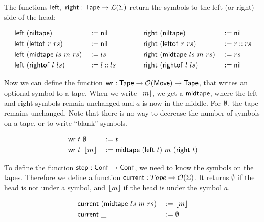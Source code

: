 The functions $\mathsf{left},~\mathsf{right} : \mathsf{Tape} \rightarrow \mathcal{L}(\Sigma)$ return the symbols to the left (or right) side of the head:
\begin{definition}
  \begin{alignat*}{4}
    \mathsf{left} &~(\mathsf{niltape})                 &&:= \mathsf{nil}
    \quad\quad\quad\quad
    & \mathsf{right}&~(\mathsf{niltape})               &&:= \mathsf{nil} \\
    \mathsf{left} &~(\mathsf{leftof}~{r}~{rs})         &&:= \mathsf{nil}
    & \mathsf{right}&~(\mathsf{leftof}~{r}~{rs})       &&:= r \mathbin{::} rs \\
    \mathsf{left} &~(\mathsf{midtape}~{ls}~{m}~{rs})   &&:= ls
    & \mathsf{right}&~(\mathsf{midtape}~{ls}~{m}~{rs}) &&:= rs \\
    \mathsf{left} &~(\mathsf{rightof}~{l}~{ls})        &&:= l \mathbin{::} ls
    & \mathsf{right}&~(\mathsf{rightof}~{l}~{ls})      &&:= \mathsf{nil}
  \end{alignat*}
\end{definition}


Now we can define the function $\mathsf{wr} : \mathsf{Tape} \rightarrow \mathcal{O}(\mathsf{Move}) \rightarrow \mathsf{Tape}$, that writes an optional symbol to a tape.  When we write $\left\lfloor {m} \right\rfloor$,
we get a $\mathsf{midtape}$, where the left and right symbols remain unchanged and $a$ is now in the middle.  For $\emptyset$, the tape remains unchanged.
Note that there is no way to decrease the number of symbols on a tape, or to write ``blank'' symbols.

\begin{definition}
  \begin{alignat*}{3}
    \mathsf{wr}~t &~ \emptyset   &&:= t \\
    \mathsf{wr}~t &~ \left\lfloor {m} \right\rfloor &&:= \mathsf{midtape}~(\mathsf{left}~t)~{m}~(\mathsf{right}~t)
  \end{alignat*}
\end{definition}

To define the function $\mathsf{step} : \mathsf{Conf} \rightarrow \mathsf{Conf}$, we need to know the symbols on the tapes.  Therefore we define a function
$\mathsf{current} : Tape \rightarrow \mathcal{O}(\Sigma)$.  It returns $\emptyset$ if the head is not under a symbol, and $\left\lfloor {m} \right\rfloor$ if the head is under the symbol
$a$.

\begin{definition}[$\MS{current}$][current]
  \begin{alignat*}{2}
    \mathsf{current}&~(\mathsf{midtape}~{ls}~{m}~{rs})&&:= \left\lfloor {m} \right\rfloor \\
    \mathsf{current}&~\_                          &&:= \emptyset
  \end{alignat*}
\end{definition}


